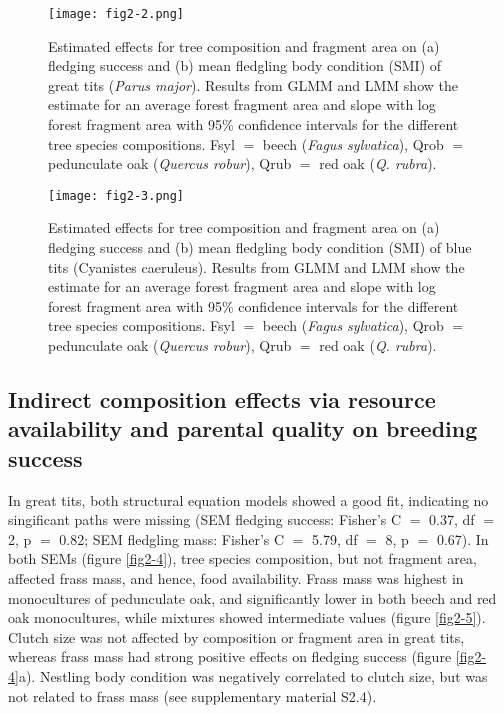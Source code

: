 \documentclass[10pt, twoside]{book} %
\begin{document}
\begin{figure}[h!]
	\begin{center}
		\texttt{[image: fig2-2.png]}
	\end{center}
	\caption{Estimated effects for tree composition and fragment area on (a) fledging success and (b) mean fledgling body condition (SMI) of great tits (\textit{Parus major}). Results from GLMM and LMM show the estimate for an average forest fragment area and slope with log forest fragment area with 95\% confidence intervals for the different tree species compositions. Fsyl $=$ beech (\textit{Fagus sylvatica}), Qrob $=$ pedunculate oak (\textit{Quercus robur}), Qrub $=$ red oak (\textit{Q. rubra}). \label{fig2-2}}
\end{figure}

\begin{figure}[h!]
	\begin{center}
		\texttt{[image: fig2-3.png]}
	\end{center}
	\caption{Estimated effects for tree composition and fragment area on (a) fledging success and (b) mean fledgling body condition (SMI) of blue tits (Cyanistes caeruleus). Results from GLMM and LMM show the estimate for an average forest fragment area and slope with log forest fragment area with 95\% confidence intervals for the different tree species compositions. Fsyl $=$ beech (\textit{Fagus sylvatica}), Qrob $=$ pedunculate oak (\textit{Quercus robur}), Qrub $=$ red oak (\textit{Q. rubra}). \label{fig2-3}}
\end{figure}
		
\clearpage		
		\subsection*{Indirect composition effects via resource availability and parental quality on breeding success}
		
		In great tits, both structural equation models showed a good fit, indicating no singificant paths were missing (SEM fledging success: Fisher's C $=$ 0.37, df $=$ 2, p $=$ 0.82; SEM fledgling mass: Fisher's C $=$ 5.79, df $=$ 8, p $=$ 0.67). In both SEMs (figure \ref{fig2-4}), tree species composition, but not fragment area, affected frass mass, and hence, food availability. Frass mass was highest in monocultures of pedunculate oak, and significantly lower in both beech and red oak monocultures, while mixtures showed intermediate values (figure \ref{fig2-5}). Clutch size was not affected by composition or fragment area in great tits, whereas frass mass had strong positive effects on fledging success (figure \ref{fig2-4}a). Nestling body condition was negatively correlated to clutch size, but was not related to frass mass (see supplementary material S2.4).\\
		
\end{document}
